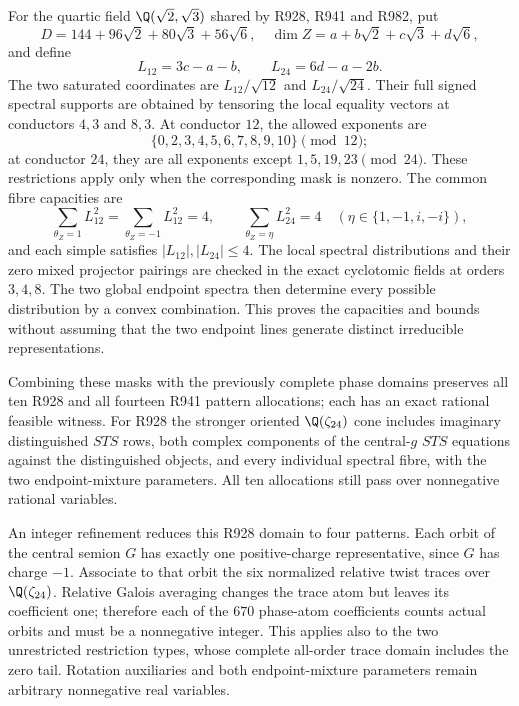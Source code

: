 For the quartic field $\Q(\sqrt2,\sqrt3)$ shared by R928, R941 and
R982, put
\[
 D=144+96\sqrt2+80\sqrt3+56\sqrt6,
 \quad \dim Z=a+b\sqrt2+c\sqrt3+d\sqrt6,
\]
and define
\[
 L_{12}=3c-a-b,\qquad L_{24}=6d-a-2b.
\]
The two saturated coordinates are $L_{12}/\sqrt{12}$ and
$L_{24}/\sqrt{24}$. Their full signed spectral supports are obtained
by tensoring the local equality vectors at conductors $4,3$ and
$8,3$. At conductor $12$, the allowed exponents are
\[
 \{0,2,3,4,5,6,7,8,9,10\}\pmod{12};
\]
at conductor $24$, they are all exponents except
$1,5,19,23\pmod{24}$. These restrictions apply only when the
corresponding mask is nonzero. The common fibre capacities are
\begin{equation}\label{eq:creative-quartic-masses}
 \sum_{\theta_Z=1}L_{12}^2=\sum_{\theta_Z=-1}L_{12}^2=4,
 \qquad
 \sum_{\theta_Z=\eta}L_{24}^2=4
       \quad(\eta\in\{1,-1,i,-i\}),
\end{equation}
and each simple satisfies $|L_{12}|,|L_{24}|\leq4$.
The local spectral distributions and their zero mixed projector
pairings are checked in the exact cyclotomic fields at orders $3,4,8$.
The two global endpoint spectra then determine every possible
distribution by a convex combination. This proves the capacities and
bounds without assuming that the two endpoint lines generate distinct
irreducible representations.

Combining these masks with the previously complete phase domains
preserves all ten R928 and all fourteen R941 pattern allocations; each
has an exact rational feasible witness. For R928 the stronger oriented
$\Q(\zeta_{24})$ cone includes imaginary distinguished $STS$ rows,
both complex components of the central-$g$ $STS$ equations against
the distinguished objects, and every individual spectral fibre, with the
two endpoint-mixture parameters. All ten allocations still pass over
nonnegative rational variables.

An integer refinement reduces this R928 domain to four patterns. Each
orbit of the central semion $G$ has exactly one positive-charge
representative, since $G$ has charge $-1$. Associate to that orbit the
six normalized relative twist traces over $\Q(\zeta_{24})$. Relative
Galois averaging changes the trace atom but leaves its coefficient one;
therefore each of the $670$ phase-atom coefficients counts actual orbits
and must be a nonnegative integer. This applies also to the two
unrestricted restriction types, whose complete all-order trace domain
includes the zero tail. Rotation auxiliaries and both endpoint-mixture
parameters remain arbitrary nonnegative real variables.

